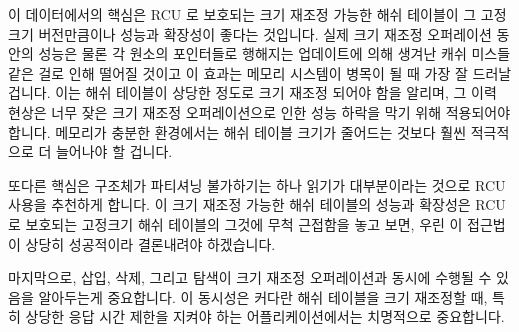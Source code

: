 이 데이터에서의 핵심은 RCU 로 보호되는 크기 재조정 가능한 해쉬 테이블이 그
고정크기 버전만큼이나 성능과 확장성이 좋다는 것입니다.
실제 크기 재조정 오퍼레이션 동안의 성능은 물론 각 원소의 포인터들로 행해지는
업데이트에 의해 생겨난 캐쉬 미스들 같은 걸로 인해 떨어질 것이고 이 효과는
메모리 시스템이 병목이 될 때 가장 잘 드러날 겁니다.
이는 해쉬 테이블이 상당한 정도로 크기 재조정 되어야 함을 알리며, 그 이력 현상은
너무 잦은 크기 재조정 오퍼레이션으로 인한 성능 하락을 막기 위해 적용되어야
합니다.
메모리가 충분한 환경에서는 해쉬 테이블 크기가 줄어드는 것보다 훨씬 적극적으로
더 늘어나야 할 겁니다.

또다른 핵심은  구조체가 파티셔닝 불가하기는 하나 읽기가
대부분이라는 것으로 RCU 사용을 추천하게 합니다.
이 크기 재조정 가능한 해쉬 테이블의 성능과 확장성은 RCU 로 보호되는 고정크기
해쉬 테이블의 그것에 무척 근접함을 놓고 보면, 우린 이 접근법이 상당히
성공적이라 결론내려야 하겠습니다.

마지막으로, 삽입, 삭제, 그리고 탐색이 크기 재조정 오퍼레이션과 동시에 수행될 수
있음을 알아두는게 중요합니다.
이 동시성은 커다란 해쉬 테이블을 크기 재조정할 때, 특히 상당한 응답 시간 제한을
지켜야 하는 어플리케이션에서는 치명적으로 중요합니다.

